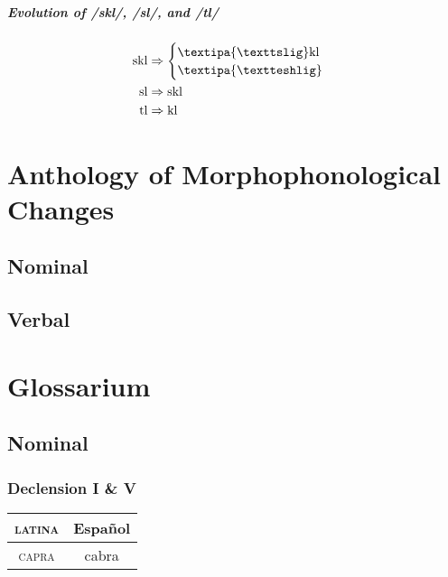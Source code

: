 \documentclass{report}
\begin{document}
\paragraph{Evolution of /skl/, /sl/, and /tl/}

\begin{align}
  \text{skl} & \Rightarrow \begin{cases}
                             \text{\textipa{\texttslig}kl} \\
                             \text{\textipa{\textteshlig}}
                           \end{cases}\\
  \text{sl} & \Rightarrow \text{skl} \\
  \text{tl} & \Rightarrow \text{kl}
\end{align}

\chapter{Anthology of Morphophonological Changes}

\section{Nominal}

\section{Verbal}

\chapter{Glossarium}

\section{Nominal}

\subsection{Declension I \& V}

\begin{tabular}{|c|c|}
  \hline
  \textsc{latina} & Español \\
  \hline
  \textsc{capra} & cabra \\
  \hline
\end{tabular}
\end{document}
